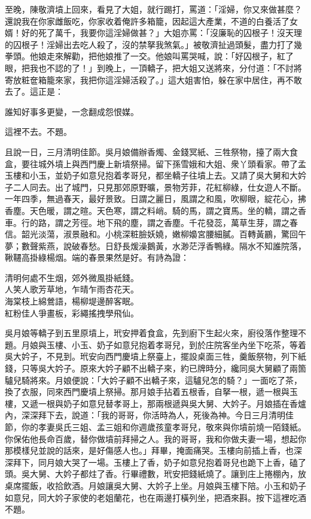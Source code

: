 至晚，陳敬濟墳上回來，看見了大姐，就行踢打，罵道：「淫婦，你又來做甚麼？還說我在你家雌飯吃，你家收着俺許多箱籠，因起這大產業，不道的白養活了女婿！好的死了萬千，我要你這淫婦做甚？」大姐亦罵：「沒廉恥的囚根子！沒天理的囚根子！淫婦出去吃人殺了，沒的禁拏我煞氣。」被敬濟扯過頭髮，盡力打了幾拳頭。他娘走來解勸，把他娘推了一交。他娘叫罵哭喊，說：「好囚根子，紅了眼，把我也不認的了！」到晚上，一頂轎子，把大姐又送將來，分付道：「不討將寄放粧奩箱籠來家，我把你這淫婦活殺了。」{}這大姐害怕，躲在家中居住，再不敢去了。這正是：

\begin{myquote}
誰知好事多更變，一念翻成怨恨媒。
\end{myquote}

這裡不去。不題。

且說一日，三月清明佳節。吳月娘備辦香燭、金錢冥紙、三牲祭物，擡了兩大食盒，要往城外墳上與西門慶上新墳祭掃。留下孫雪娥和大姐、衆丫頭看家。帶了孟玉樓和小玉，並奶子如意兒抱着孝哥兒，都坐轎子往墳上去。又請了吳大舅和大妗子二人同去。出了城門，只見那郊原野曠，景物芳菲，花紅柳綠，仕女遊人不斷。一年四季，無過春天，最好景致。{}日謂之麗日，風謂之和風，吹柳眼，綻花心，拂香塵。天色暖，謂之暄。天色寒，謂之料峭。騎的馬，謂之寶馬。坐的轎，謂之香車。行的路，謂之芳徑。地下飛的塵，謂之香塵。千花發蕊，萬草生芽，謂之春信。韶光淡蕩，淑景融和。小桃深粧臉妖嬈，嫩柳嬝宮腰細膩。百轉黃鸝，驚回午夢；數聲紫燕，說破春愁。日舒長煖澡鵝黃，水渺茫浮香鴨綠。隔水不知誰院落，鞦韆高掛綠楊烟。端的春景果然是好。有詩為證：

\begin{myquote}
清明何處不生烟，郊外微風掛紙錢。\\人笑人歌芳草地，乍晴乍雨杏花天。\\海棠枝上綿鶯語，楊柳堤邊醉客眠。\\紅粉佳人爭畫板，彩繩搖拽學飛仙。
\end{myquote}

吳月娘等轎子到五里原墳上，玳安押着食盒，先到廚下生起火來，{}廚役落作整理不題。月娘與玉樓、小玉、奶子如意兒抱着孝哥兒，到於庄院客坐內坐下吃茶，等着吳大妗子，不見到。玳安向西門慶墳上祭臺上，擺設桌面三牲，羹飯祭物，列下紙錢，只等吳大妗子。原來大妗子顧不出轎子來，約已牌時分，纔同吳大舅顧了兩箇驢兒騎將來。{}月娘便說：「大妗子顧不出轎子來，這驢兒怎的騎？」一面吃了茶，換了衣服，同來西門慶墳上祭掃。那月娘手拈着五根香，自拏一根，遞一根與玉樓，又遞一根與奶子如意兒替孝哥上，那兩根遞與吳大舅、大妗子。月娘插在香爐內，深深拜下去，說道：「我的哥哥，你活時為人，死後為神。今日三月清明佳節，你的孝妻吳氏三姐、孟三姐和你週歲孩童孝哥兒，敬來與你墳前燒一陌錢紙。你保佑他長命百歲，替你做墳前拜掃之人。我的哥哥，我和你做夫妻一場，想起你那模樣兒並說的話來，是好傷感人也。」拜畢，掩面痛哭。玉樓向前插上香，也深深拜下，同月娘大哭了一場。玉樓上了香，奶子如意兒抱着哥兒也跪下上香，磕了頭。吳大舅、大妗子都炷了香。行畢禮數，玳安把錢紙燒了。讓到庄上捲棚內，放桌席擺飯，收拾飲酒。月娘讓吳大舅、大妗子上坐。月娘與玉樓下陪。小玉和奶子如意兒，同大妗子家使的老姐蘭花，也在兩邊打橫列坐，把酒來斟。按下這裡吃酒不題。

